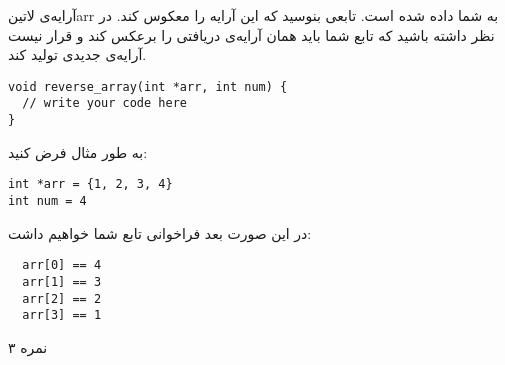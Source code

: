 
آرایه‌ی ‌لاتین{arr} به شما داده شده است. تابعی بنوسید که این آرایه را معکوس کند.
در نظر داشته باشید که تابع شما باید همان آرایه‌ی دریافتی را برعکس کند و قرار نیست آرایه‌ی جدیدی تولید کند.

\begin{latin}
\begin{verbatim}
void reverse_array(int *arr, int num) {
  // write your code here
}
\end{verbatim}
\end{latin}

به طور مثال فرض کنید:

\begin{latin}
\begin{verbatim}
int *arr = {1, 2, 3, 4}
int num = 4
\end{verbatim}
\end{latin}

در این صورت بعد فراخوانی تابع شما خواهیم داشت:

\begin{latin}
\begin{verbatim}
  arr[0] == 4
  arr[1] == 3
  arr[2] == 2
  arr[3] == 1
\end{verbatim}
\end{latin}

۳ نمره
